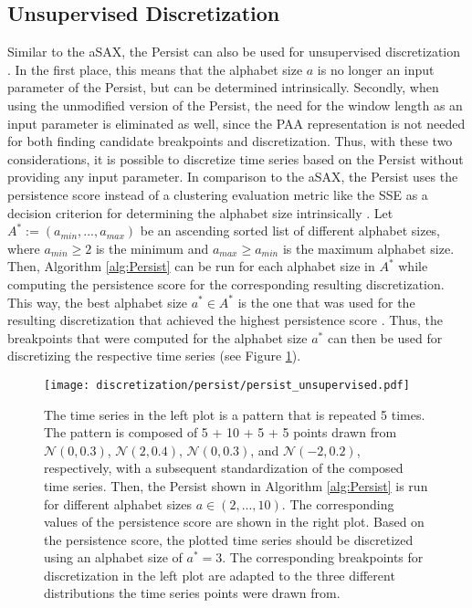 \subsection*{Unsupervised Discretization}
Similar to the \ac{aSAX}, the Persist can also be used for unsupervised discretization \cite{Persist}. In the first place, this means that the alphabet size $a$ is no longer an input parameter of the Persist, but can be determined intrinsically. Secondly, when using the unmodified version of the Persist, the need for the window length as an input parameter is eliminated as well, since the \ac{PAA} representation is not needed for both finding candidate breakpoints and discretization. Thus, with these two considerations, it is possible to discretize time series based on the Persist without providing any input parameter. \newline
In comparison to the \ac{aSAX}, the Persist uses the persistence score instead of a clustering evaluation metric like the \ac{SSE} as a decision criterion for determining the alphabet size intrinsically \cite{Persist}. Let $A^* := (a_{min}, ..., a_{max})$ be an ascending sorted list of different alphabet sizes, where $a_{min} \geq 2$ is the minimum and $a_{max} \geq a_{min}$ is the maximum alphabet size. Then, Algorithm \ref{alg:Persist} can be run for each alphabet size in $A^*$ while computing the persistence score for the corresponding resulting discretization. This way, the best alphabet size $a^* \in A^*$ is the one that was used for the resulting discretization that achieved the highest persistence score \cite{Persist}. Thus, the breakpoints that were computed for the alphabet size $a^*$ can then be used for discretizing the respective time series (see Figure \ref{fig:unsupervised_persist}).
\newpage
\begin{figure}[htb]
\centering
\texttt{[image: discretization/persist/persist\_unsupervised.pdf]}
\caption[Persist - Unsupervised Discretization]{The time series in the left plot is a pattern that is repeated 5 times. The pattern is composed of 5 + 10 + 5 + 5 points drawn from $\mathcal{N}(0,0.3)$, $\mathcal{N}(2,0.4)$, $\mathcal{N}(0,0.3)$, and $\mathcal{N}(-2,0.2)$, respectively, with a subsequent standardization of the composed time series. Then, the Persist shown in Algorithm \ref{alg:Persist} is run for different alphabet sizes $a \in (2, ..., 10)$. The corresponding values of the persistence score are shown in the right plot. Based on the persistence score, the plotted time series should be discretized using an alphabet size of $a^* = 3$. The corresponding breakpoints for discretization in the left plot are adapted to the three different distributions the time series points were drawn from.}
\label{fig:unsupervised_persist}
\end{figure}
